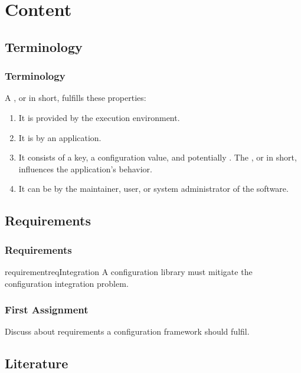\documentclass{beamer}
\begin{document}
\section{Content}

\subsection{Terminology}

\begin{frame}
	\frametitle{Terminology}
\begin{definition}
\label{def:configuration-setting}
A ,
or  in short,
fulfills these properties:
\begin{enumerate}
\item
It is provided by the execution environment.
\item
It is  by an application.
\item
It consists of a key, a configuration value, and potentially .
The , or  in short, influences the application's behavior.
\item
It can be  by the maintainer, user, or system administrator of the software.
\end{enumerate}
\end{definition}
\end{frame}

\subsection{Requirements}

\begin{frame}
	\frametitle{Requirements}
\begin{restatable}{requirement}{reqIntegration}
A configuration library must mitigate the configuration integration problem.%
\label{req:integration}
\end{restatable}
\end{frame}



\begin{assignment}
	\frametitle{First Assignment}
	Discuss about requirements a configuration framework should fulfil.
\end{assignment}


\subsection{Literature}

\nocite{raab2017introducing}

\begin{frame}[allowframebreaks]
	
	
\end{frame}
\end{document}

